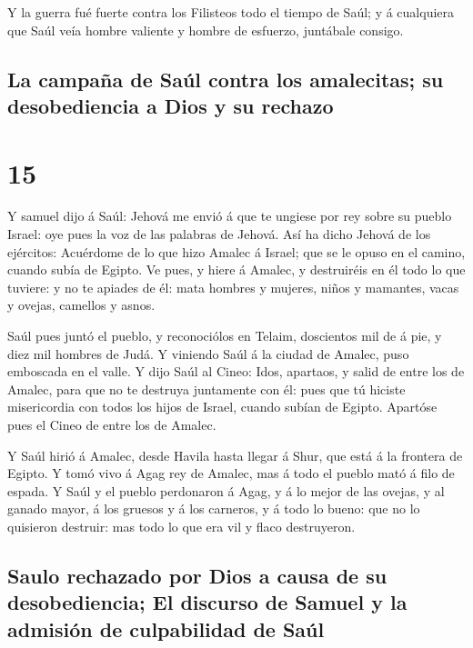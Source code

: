  Y la guerra fué fuerte contra los Filisteos todo el tiempo
de Saúl; y á cualquiera que Saúl veía hombre valiente y hombre de
esfuerzo, juntábale consigo.

\hypertarget{la-campauxf1a-de-sauxfal-contra-los-amalecitas-su-desobediencia-a-dios-y-su-rechazo}{%
\subsection{La campaña de Saúl contra los amalecitas; su desobediencia a
Dios y su
rechazo}\label{la-campauxf1a-de-sauxfal-contra-los-amalecitas-su-desobediencia-a-dios-y-su-rechazo}}

\hypertarget{section-14}{%
\section{15}\label{section-14}}

 Y samuel dijo á Saúl: Jehová me envió á que te ungiese por
rey sobre su pueblo Israel: oye pues la voz de las palabras de Jehová.
 Así ha dicho Jehová de los ejércitos: Acuérdome de lo que
hizo Amalec á Israel; que se le opuso en el camino, cuando subía de
Egipto.  Ve pues, y hiere á Amalec, y destruiréis en él todo
lo que tuviere: y no te apiades de él: mata hombres y mujeres, niños y
mamantes, vacas y ovejas, camellos y asnos.

 Saúl pues juntó el pueblo, y reconociólos en Telaim,
doscientos mil de á pie, y diez mil hombres de Judá.  Y
viniendo Saúl á la ciudad de Amalec, puso emboscada en el valle.
 Y dijo Saúl al Cineo: Idos, apartaos, y salid de entre los
de Amalec, para que no te destruya juntamente con él: pues que tú
hiciste misericordia con todos los hijos de Israel, cuando subían de
Egipto. Apartóse pues el Cineo de entre los de Amalec.

 Y Saúl hirió á Amalec, desde Havila hasta llegar á Shur,
que está á la frontera de Egipto.  Y tomó vivo á Agag rey de
Amalec, mas á todo el pueblo mató á filo de espada.  Y Saúl
y el pueblo perdonaron á Agag, y á lo mejor de las ovejas, y al ganado
mayor, á los gruesos y á los carneros, y á todo lo bueno: que no lo
quisieron destruir: mas todo lo que era vil y flaco destruyeron.

\hypertarget{saulo-rechazado-por-dios-a-causa-de-su-desobediencia-el-discurso-de-samuel-y-la-admisiuxf3n-de-culpabilidad-de-sauxfal}{%
\subsection{Saulo rechazado por Dios a causa de su desobediencia; El
discurso de Samuel y la admisión de culpabilidad de
Saúl}\label{saulo-rechazado-por-dios-a-causa-de-su-desobediencia-el-discurso-de-samuel-y-la-admisiuxf3n-de-culpabilidad-de-sauxfal}}

